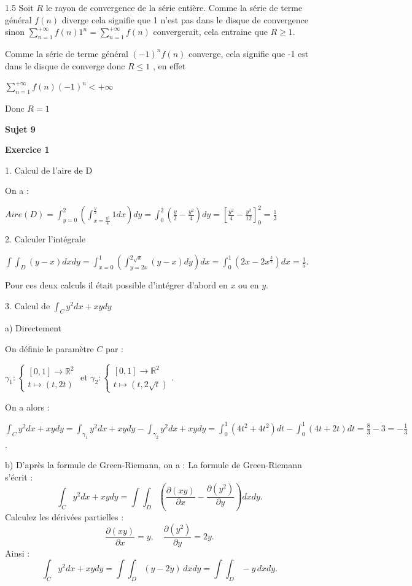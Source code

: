 \documentclass[12pt]{article}
\begin{document}
\begin{spacing}{1.5}
 Soit $R$ le rayon de convergence de la série entière. Comme la série de terme général $f(n)$ diverge cela signifie que 1  n'est pas dans le disque de convergence sinon
$\sum_{n=1}^{+\infty}f(n)1^n=\sum_{n=1}^{+\infty}f(n)$ convergerait, cela entraine que $R\geq 1$.

Comme la série de terme général $(-1)^nf(n)$ converge, cela signifie que -1 est dans le disque de 
converge donc $R\leq 1$ , en effet

$\sum_{n=1}^{+\infty}f(n)(-1)^n< +\infty$

Donc $R=1$


\medskip\textbf{Sujet 9}

\textbf{Exercice 1}

1. Calcul de l'aire de D

On a :

$Aire(D)=\int_{y=0}^2(\int_{x=\frac{y^2}{4}}^{\frac{y}{2}}1dx)dy=\int_0^2(\frac{y}{2}-\frac{y^2}{4})dy=[\frac{y^2}{4}-\frac{y^3}{12}]_0^2=\frac{1}{3}$

2. Calculer l'intégrale

$\int\int_D(y-x)dxdy=\int_{x=0}^{1}(\int_{y=2x}^{2\sqrt{x}}(y-x)dy)dx=\int_{0}^{1}(2x-2x^{\frac{3}{2}})dx=\frac{1}{5}$.

 Pour ces deux calculs il était possible d'intégrer d'abord en $x$ ou en $y$.
 
 3. Calcul de $\int_Cy^2dx+xydy$
 
 a) Directement
 
 On définie le paramètre $C$ par :
 
 $\gamma_1 : \begin{cases}
 [0,1]\rightarrow \mathbb{R}^2\\
 t\mapsto (t,2t)
 \end{cases}$ et $\gamma_2 : \begin{cases}
 [0,1]\rightarrow \mathbb{R}^2\\
 t\mapsto (t,2\sqrt{t})
 \end{cases}$.
 
 On a alors :
 
 $\int_Cy^2dx+xydy=\int_{\gamma_1}y^2dx+xydy-\int_{\gamma_2}y^2dx+xydy=\int_0^1(4t^2+4t^2)dt-\int_0^1(4t+2t)dt=\frac{8}{3}-3=-\frac{1}{3}$.
 
b) D'après la formule de Green-Riemann, on a :
La formule de Green-Riemann s'\'ecrit :
\[
\int_C y^2 dx + xy dy = \int\int_D \left( \frac{\partial(xy)}{\partial x} - \frac{\partial(y^2)}{\partial y} \right) dxdy.
\]
Calculez les d\'eriv\'ees partielles :
\[
\frac{\partial(xy)}{\partial x} = y, \quad \frac{\partial(y^2)}{\partial y} = 2y.
\]
Ainsi :
\[
\int_C y^2 dx + xy dy = \int\int_D (y - 2y) \, dxdy = \int\int_D -y \, dxdy.
\]


\end{spacing}
\end{document}
